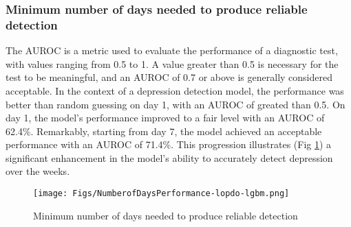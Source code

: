 \subsubsection{Minimum number of days needed to produce reliable detection}



The AUROC is a metric used to evaluate the performance of a diagnostic test, with values ranging from 0.5 to 1. A value greater than 0.5 is necessary for the test to be meaningful, and an AUROC of 0.7 or above is generally considered acceptable. In the context of a depression detection model, the performance was better than random guessing on day 1, with an AUROC of greated than 0.5. On day 1, the model's performance improved to a fair level with an AUROC of 62.4\%. Remarkably, starting from day 7, the model achieved an acceptable performance with an AUROC of 71.4\%. This progression illustrates (Fig \ref{fig:NumberofDaysPerformance}) a significant enhancement in the model's ability to accurately detect depression over the weeks.

\begin{figure}[h]
    \texttt{[image: Figs/NumberofDaysPerformance-lopdo-lgbm.png]}
    \caption{Minimum number of days needed to produce reliable detection}
    \label{fig:NumberofDaysPerformance}
\end{figure}

